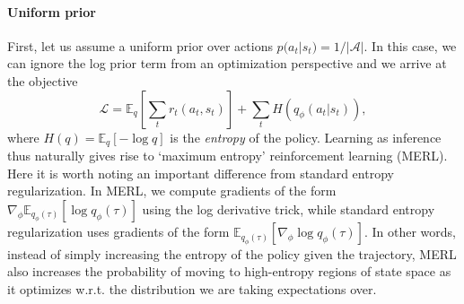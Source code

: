 \paragraph{Uniform prior}
First, let us assume a uniform prior over actions $p(a_t | s_t) = 1/|\mathcal{A}|$.
In this case, we can ignore the log prior term from an optimization perspective and we arrive at the objective
\begin{equation}
    \mathcal{L} = \mathbb{E}_q \left [ \sum_t r_t(a_t, s_t) \right ] + \sum_t H(q_\phi(a_t | s_t)),
\end{equation}
where $H(q) = \mathbb{E}_q [- \log q]$ is the \emph{entropy} of the policy.
Learning as inference thus naturally gives rise to `maximum entropy' reinforcement learning (MERL).
Here it is worth noting an important difference from standard entropy regularization.
In MERL, we compute gradients of the form $\nabla_\phi \mathbb{E}_{q_\phi(\tau)} [\log q_\phi(\tau)]$ using the log derivative trick, while standard entropy regularization uses gradients of the form $\mathbb{E}_{q_\phi(\tau)} [\nabla_\phi \log q_\phi(\tau)]$.
In other words, instead of simply increasing the entropy of the policy given the trajectory, MERL also increases the probability of moving to high-entropy regions of state space as it optimizes w.r.t. the distribution we are taking expectations over.
